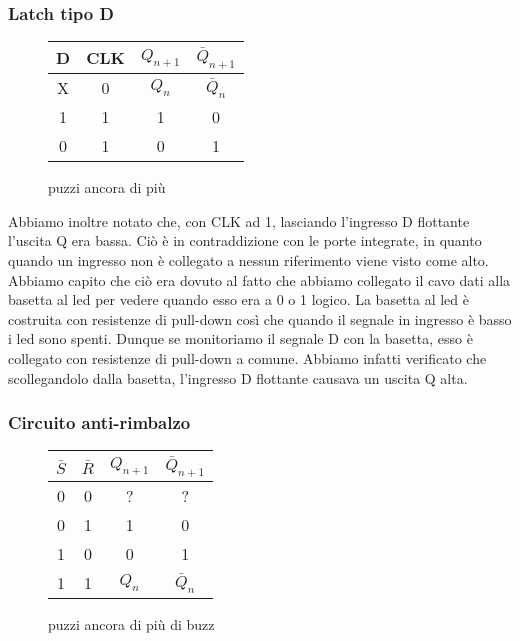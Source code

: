 \subsubsection*{Latch tipo D}


\begin{figure}[H]
		\centering
		{\renewcommand{\arraystretch}{1.1}%
		\begin{tabular}{c|c|c|c}
		D & CLK & $Q_{n+1}$ & $\bar Q_{n+1}$  \\
		\hline
		X & 0  & $Q_n$ & $\bar Q_n$\\
		\hline
		 1&1 & 1 & 0\\
		\hline
		0&1 & 0  &1\\
		\end{tabular}}
		\label{tab11:Latch_D}
		\caption{puzzi ancora di più}
        \end{figure}

Abbiamo inoltre notato che, con CLK ad 1, lasciando l'ingresso D flottante l'uscita Q era bassa. Ciò è in contraddizione con le porte integrate, in quanto quando un ingresso non è collegato a nessun riferimento viene visto come alto. Abbiamo capito che ciò era dovuto al fatto che abbiamo collegato il cavo dati alla basetta al led per vedere quando esso era a 0 o 1 logico. La basetta al led è costruita con resistenze di pull-down così che quando il segnale in ingresso è basso i led sono spenti. Dunque se monitoriamo il segnale D con la basetta, esso è collegato con resistenze di pull-down a comune. Abbiamo infatti verificato che scollegandolo dalla basetta, l'ingresso D flottante causava un uscita Q alta.


\subsubsection*{Circuito anti-rimbalzo}


\begin{figure}[H]
		\centering
		{\renewcommand{\arraystretch}{1.1}%
		\begin{tabular}{c|c|c|c}
		$\bar S$ & $\bar R$ & $Q_{n+1}$ & $\bar Q_{n+1}$  \\
		\hline
		0 & 0  & ?&?\\
		\hline
		0&1 & 1 & 0\\
		\hline
		1&0 & 0  &1\\
		\hline
		1&1 & $Q_n$ & $\bar Q_n$\\
		\end{tabular}}
		\label{tab11:antirimb}
		\caption{puzzi ancora di più di buzz}
        \end{figure}

